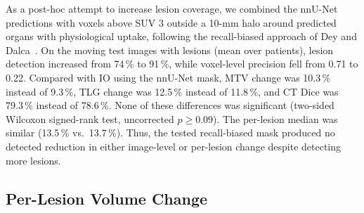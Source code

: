 As a post-hoc attempt to increase lesion coverage, we combined the nnU-Net predictions with voxels above SUV 3 outside a 10-mm halo around predicted organs with physiological uptake, following the recall-biased approach of Dey and Dalca~\cite{dey2026registration}.
On the moving test images with lesions (mean over patients), lesion detection increased from 74\,\% to 91\,\%, while voxel-level precision fell from 0.71 to 0.22.
Compared with IO using the nnU-Net mask, MTV change was 10.3\,\% instead of 9.3\,\%, TLG change was 12.5\,\% instead of 11.8\,\%, and CT Dice was 79.3\,\% instead of 78.6\,\%.
None of these differences was significant (two-sided Wilcoxon signed-rank test, uncorrected $p\geq0.09$).
The per-lesion median was similar (13.5\,\% vs.\ 13.7\,\%).
Thus, the tested recall-biased mask produced no detected reduction in either image-level or per-lesion change despite detecting more lesions.


\subsection{Per-Lesion Volume Change}
\label{sect:res_lesions}

